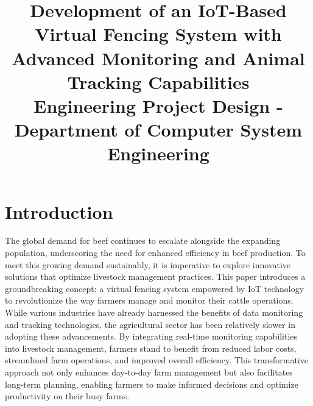 \documentclass[conference]{main}
\begin{document}
\title{
    Development of an IoT-Based Virtual Fencing System with Advanced Monitoring and
    Animal Tracking Capabilities\\
{\footnotesize Engineering Project Design -
Department of Computer System Engineering }
}

\author{
\and
{}
}

\maketitle



\section{Introduction}
The global demand for beef continues to escalate alongside the expanding
population, underscoring the need for enhanced efficiency in beef production. To
meet this growing demand sustainably, it is imperative to explore innovative
solutions that optimize livestock management practices. This paper introduces a
groundbreaking concept: a virtual fencing system empowered by IoT technology to
revolutionize the way farmers manage and monitor their cattle operations. While
various industries have already harnessed the benefits of data monitoring and
tracking technologies, the agricultural sector has been relatively slower in
adopting these advancements. By integrating real-time monitoring capabilities
into livestock management, farmers stand to benefit from reduced labor costs,
streamlined farm operations, and improved overall efficiency. This
transformative approach not only enhances day-to-day farm management but also
facilitates long-term planning, enabling farmers to make informed decisions and
optimize productivity on their busy farms.
\end{document}
